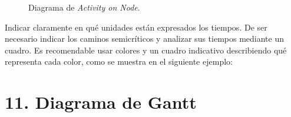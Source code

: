 \documentclass[
11pt, %
codirector, %
]{charter}
\begin{document}
\begin{figure}[htpb]
\centering 
\caption{Diagrama de \textit{Activity on Node}.}
\label{fig:AoN}
\end{figure}

Indicar claramente en qué unidades están expresados los tiempos.
De ser necesario indicar los caminos semicríticos y analizar sus tiempos mediante un cuadro.
Es recomendable usar colores y un cuadro indicativo describiendo qué representa cada color, como se muestra en el siguiente ejemplo:



\section{11. Diagrama de Gantt}
\label{sec:gantt}
\end{document}
